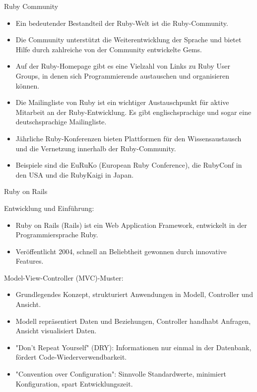 \documentclass{beamer}
\begin{document}
\begin{frame}{Ruby Community}
  \begin{itemize}
    \item Ein bedeutender Bestandteil der Ruby-Welt ist die Ruby-Community.
    \item Die Community unterstützt die Weiterentwicklung der Sprache und bietet Hilfe durch zahlreiche von der Community entwickelte Gems.
    \item Auf der Ruby-Homepage gibt es eine Vielzahl von Links zu Ruby User Groups, in denen sich Programmierende austauschen und organisieren können.
    \item Die Mailingliste von Ruby ist ein wichtiger Austauschpunkt für aktive Mitarbeit an der Ruby-Entwicklung. Es gibt englischsprachige und sogar eine deutschsprachige Mailingliste.
    \item Jährliche Ruby-Konferenzen bieten Plattformen für den Wissensaustausch und die Vernetzung innerhalb der Ruby-Community.
    \item Beispiele sind die EuRuKo (European Ruby Conference), die RubyConf in den USA und die RubyKaigi in Japan.
  \end{itemize}
\end{frame}
\begin{frame}{Ruby on Rails}

Entwicklung und Einführung:
  \begin{itemize}
    \item Ruby on Rails (Rails) ist ein Web Application Framework, entwickelt in der Programmiersprache Ruby.
    \item Veröffentlicht 2004, schnell an Beliebtheit gewonnen durch innovative Features.
  \end{itemize}


Model-View-Controller (MVC)-Muster:

  \begin{itemize}
    \item Grundlegendes Konzept, strukturiert Anwendungen in Modell, Controller und Ansicht.
    \item Modell repräsentiert Daten und Beziehungen, Controller handhabt Anfragen, Ansicht visualisiert Daten.
  \end{itemize}

  \begin{itemize}
    \item "Don't Repeat Yourself" (DRY): Informationen nur einmal in der Datenbank, fördert Code-Wiederverwendbarkeit.
    \item "Convention over Configuration": Sinnvolle Standardwerte, minimiert Konfiguration, spart Entwicklungszeit.
  \end{itemize}
\end{frame}
\end{document}
